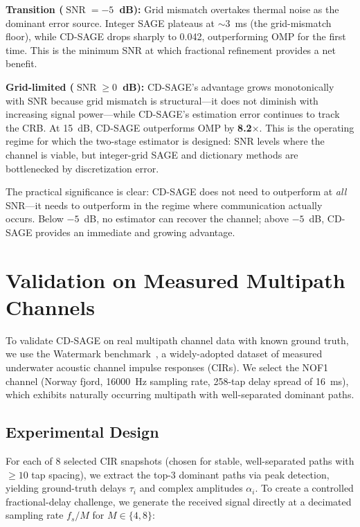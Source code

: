 \documentclass[a4paper,fleqn]{cas-dc}
\DeclareMathOperator{\SNR}{SNR}
\begin{document}
\textbf{Transition ($\SNR = -5$~dB):} Grid mismatch overtakes thermal noise as the dominant error source. Integer SAGE plateaus at $\sim$3~ms (the grid-mismatch floor), while CD-SAGE drops sharply to 0.042, outperforming OMP for the first time. This is the minimum SNR at which fractional refinement provides a net benefit.

\textbf{Grid-limited ($\SNR \ge 0$~dB):} CD-SAGE's advantage grows monotonically with SNR because grid mismatch is structural---it does not diminish with increasing signal power---while CD-SAGE's estimation error continues to track the CRB. At \SI{+15}{dB}, CD-SAGE outperforms OMP by \textbf{8.2$\times$}. This is the operating regime for which the two-stage estimator is designed: SNR levels where the channel is viable, but integer-grid SAGE and dictionary methods are bottlenecked by discretization error.

The practical significance is clear: CD-SAGE does not need to outperform at \textit{all} SNR---it needs to outperform in the regime where communication actually occurs. Below $-5$~dB, no estimator can recover the channel; above $-5$~dB, CD-SAGE provides an immediate and growing advantage.

\section{Validation on Measured Multipath Channels}
\label{sec:watermark}

To validate CD-SAGE on real multipath channel data with known ground truth, we use the Watermark benchmark~\cite{watermark2017}, a widely-adopted dataset of measured underwater acoustic channel impulse responses (CIRs). We select the NOF1 channel (Norway fjord, \SI{16000}{Hz} sampling rate, 258-tap delay spread of \SI{16}{ms}), which exhibits naturally occurring multipath with well-separated dominant paths.

\subsection{Experimental Design}

For each of 8 selected CIR snapshots (chosen for stable, well-separated paths with $\ge10$ tap spacing), we extract the top-3 dominant paths via peak detection, yielding ground-truth delays $\tau_i$ and complex amplitudes $\alpha_i$. To create a controlled fractional-delay challenge, we generate the received signal directly at a decimated sampling rate $f_s / M$ for $M \in \{4, 8\}$:
\end{document}
